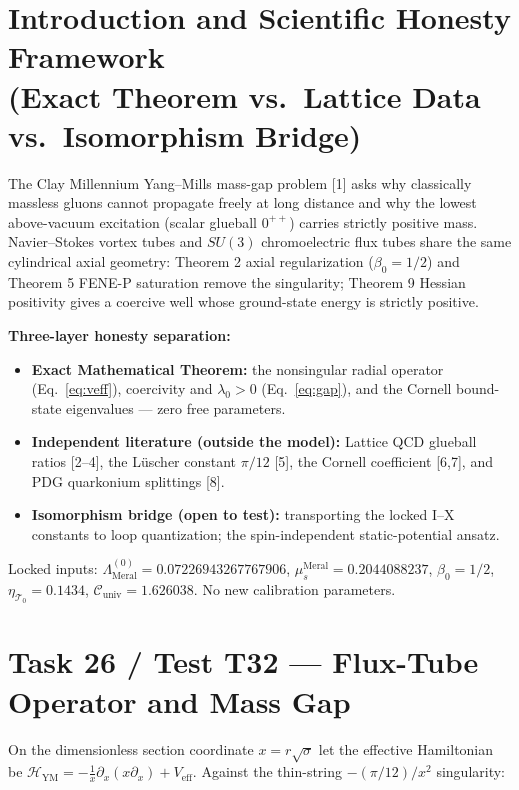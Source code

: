 \documentclass[12pt,a4paper]{article}
\begin{document}
\section{Introduction and Scientific Honesty Framework \\ (Exact Theorem vs.\ Lattice Data vs.\ Isomorphism Bridge)}

The Clay Millennium Yang--Mills mass-gap problem [1] asks why classically
massless gluons cannot propagate freely at long distance and why the lowest
above-vacuum excitation (scalar glueball $0^{++}$) carries strictly positive
mass. Navier--Stokes vortex tubes and $SU(3)$ chromoelectric flux tubes share
the same cylindrical axial geometry: Theorem 2 axial regularization
($\beta_0=1/2$) and Theorem 5 FENE-P saturation remove the singularity;
Theorem 9 Hessian positivity gives a coercive well whose ground-state energy
is strictly positive.

\textbf{Three-layer honesty separation:}
\begin{itemize}
    \item \textbf{Exact Mathematical Theorem:} the nonsingular radial operator
    (Eq.~\ref{eq:veff}), coercivity and $\lambda_0>0$ (Eq.~\ref{eq:gap}), and
    the Cornell bound-state eigenvalues --- zero free parameters.
    \item \textbf{Independent literature (outside the model):} Lattice QCD
    glueball ratios [2--4], the L\"uscher constant $\pi/12$ [5], the Cornell
    coefficient [6,7], and PDG quarkonium splittings [8].
    \item \textbf{Isomorphism bridge (open to test):} transporting the locked
    I--X constants to loop quantization; the spin-independent static-potential
    ansatz.
\end{itemize}
Locked inputs: $\Lambda_{\mathrm{Meral}}^{(0)} = 0.07226943267767906$,
$\mu_s^{\mathrm{Meral}} = 0.2044088237$, $\beta_0 = 1/2$,
$\eta_{\mathcal{T}_0} = 0.1434$,
$\mathcal{C}_{\mathrm{univ}} = 1.626038$. No new calibration parameters.

\section{Task 26 / Test T32 --- Flux-Tube Operator and Mass Gap}

On the dimensionless section coordinate $x=r\sqrt{\sigma}$ let the effective
Hamiltonian be
$\mathcal{H}_{\mathrm{YM}}=-\frac{1}{x}\partial_x(x\partial_x)+V_{\mathrm{eff}}$.
Against the thin-string $-(\pi/12)/x^2$ singularity:
\end{document}
